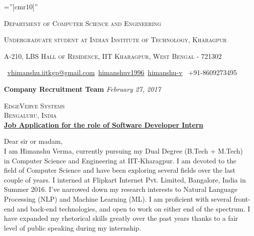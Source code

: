 \documentclass[a4paper,10pt]{extarticle} %
\begin{document}
\pagestyle{empty} %

\font\fb=''[cmr10]'' %

\par{\par} %
\par{\centering\large {\textsc{Department of Computer Science and Engineering}}\par}\large
\par{\centering\large {\textsc{Undergraduate student at Indian Institute of Technology, Kharagpur}}\par}\large
\par{\centering\large {\textsc{A-210, LBS Hall of Residence, IIT Kharagpur, West Bengal - 721302}}\par}\large
\hspace{1cm}\normalsize \faEnvelope\ {\href{mailto:vhimanshu.iitkgp@gmail.com}{vhimanshu.iitkgp@gmail.com}}\hfill \normalsize \faGithub\ {\href{https://github.com/himanshuv1996}{himanshuv1996}}\hfill \normalsize \faLinkedinSquare\ {\href{https://www.linkedin.com/in/himanshu-v}{himanshu-v}} \hfill {\faPhone\ +91-8609273495} \hspace{1cm}\vspace{10pt}

\textbf{\large{Company Recruitment Team}} \hfill \textit{February 27, 2017}

\textsc{EdgeVerve Systems} \\
\textsc{Bengaluru, India}\\

\underline{\textbf{Job Application for the role of Software Developer Intern}}

Dear sir or madam,\\

I am Himanshu Verma, currently pursuing my Dual Degree (B.Tech + M.Tech) in Computer Science and Engineering at IIT-Kharagpur. I am devoted to the ﬁeld of Computer Science and have been exploring several ﬁelds over the last couple of years. I interned at Flipkart Internet Pvt. Limited, Bangalore, India in Summer 2016. I've narrowed down my research interests to Natural Language Processing (NLP) and Machine Learning (ML). I am proficient with several front-end and back-end technologies, and open to work on either end of the spectrum. I have expanded my rhetorical skills greatly over the past years thanks to a fair level of public speaking during my internship. \\
\end{document}
